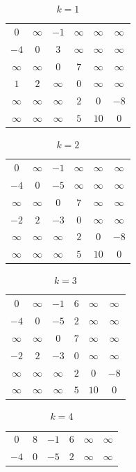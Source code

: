\documentclass[a4paper,twoside]{article}
\begin{document}
\begin{spacing}{1.2}
\begin{multicols}{2}
\begin{table}[H]
	\centering
	\caption{$k=1$}
	\label{tab:floyd1}
	\begin{tabular}{cccccc}
		$0$&$\infty$&$-1$&$\infty$&$\infty$&$\infty$\\
		$-4$&$0$&$3$&$\infty$&$\infty$&$\infty$\\
		$\infty$&$\infty$&$0$&$7$&$\infty$&$\infty$\\
		$1$&$2$&$\infty$&$0$&$\infty$&$\infty$\\
		$\infty$&$\infty$&$\infty$&$2$&$0$&$-8$\\
		$\infty$&$\infty$&$\infty$&$5$&$10$&$0$
	\end{tabular}
\end{table}
\begin{table}[H]
	\centering
	\caption{$k=2$}
	\label{tab:floyd2}
	\begin{tabular}{cccccc}
		$0$&$\infty$&$-1$&$\infty$&$\infty$&$\infty$\\
		$-4$&$0$&$-5$&$\infty$&$\infty$&$\infty$\\
		$\infty$&$\infty$&$0$&$7$&$\infty$&$\infty$\\
		$-2$&$2$&$-3$&$0$&$\infty$&$\infty$\\
		$\infty$&$\infty$&$\infty$&$2$&$0$&$-8$\\
		$\infty$&$\infty$&$\infty$&$5$&$10$&$0$
	\end{tabular}
\end{table}
\begin{table}[H]
	\centering
	\caption{$k=3$}
	\label{tab:floyd3}
	\begin{tabular}{cccccc}
		$0$&$\infty$&$-1$&$6$&$\infty$&$\infty$\\
		$-4$&$0$&$-5$&$2$&$\infty$&$\infty$\\
		$\infty$&$\infty$&$0$&$7$&$\infty$&$\infty$\\
		$-2$&$2$&$-3$&$0$&$\infty$&$\infty$\\
		$\infty$&$\infty$&$\infty$&$2$&$0$&$-8$\\
		$\infty$&$\infty$&$\infty$&$5$&$10$&$0$
	\end{tabular}
\end{table}
\begin{table}[H]
	\centering
	\caption{$k=4$}
	\label{tab:floyd4}
	\begin{tabular}{cccccc}
		$0$&$8$&$-1$&$6$&$\infty$&$\infty$\\
		$-4$&$0$&$-5$&$2$&$\infty$&$\infty$\\

\end{tabular}
\end{table}
\end{multicols}
\end{spacing}
\end{document}
